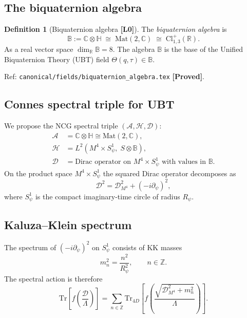 \documentclass[12pt,a4paper]{article}
\theoremstyle{definition}
\newtheorem{definition}[theorem]{Definition}
\theoremstyle{remark}
\newcommand{\PROVED}{\textbf{[Proved]}}
\newcommand{\Lzero}{\textbf{[L0]}}
\newcommand{\CC}{\mathbb{C}}
\newcommand{\Bq}{\mathbb{C}\otimes\mathbb{H}}
\begin{document}
\subsection{The biquaternion algebra}

\begin{definition}[Biquaternion algebra \Lzero]
The \emph{biquaternion algebra} is
\[
\mathbb{B} := \Bq \;\cong\; \mathrm{Mat}(2,\CC) \;\cong\; \mathrm{Cl}^{+}_{1,3}(\mathbb{R}).
\]
As a real vector space $\dim_\mathbb{R}\mathbb{B}=8$.
The algebra $\mathbb{B}$ is the base of the Unified Biquaternion Theory (UBT)
field $\Theta(q,\tau)\in\mathbb{B}$.

Ref: \texttt{canonical/fields/biquaternion\_algebra.tex} \PROVED.
\end{definition}

\subsection{Connes spectral triple for UBT}

We propose the NCG spectral triple $(\mathcal{A},\mathcal{H},\mathcal{D})$:
\begin{align}
\mathcal{A} &= \Bq \cong \mathrm{Mat}(2,\CC), \\
\mathcal{H} &= L^2(M^4\times S^1_\psi,\; S\otimes\mathbb{B}), \\
\mathcal{D} &= \text{Dirac operator on }M^4\times S^1_\psi\text{ with values in }\mathbb{B}.
\end{align}
On the product space $M^4\times S^1_\psi$ the squared Dirac operator decomposes as
\begin{equation}
\mathcal{D}^2 = \mathcal{D}_{M^4}^2 + (-i\partial_\psi)^2,
\label{eq:D2}
\end{equation}
where $S^1_\psi$ is the compact imaginary-time circle of radius $R_\psi$.

\subsection{Kaluza--Klein spectrum}

The spectrum of $(-i\partial_\psi)^2$ on $S^1_\psi$ consists of KK masses
\begin{equation}
m_n^2 = \frac{n^2}{R_\psi^2}, \qquad n\in\mathbb{Z}.
\label{eq:KKspectrum}
\end{equation}
The spectral action is therefore
\begin{equation}
\mathrm{Tr}\!\left[f\!\left(\frac{\mathcal{D}}{\Lambda}\right)\right]
= \sum_{n\in\mathbb{Z}}
  \mathrm{Tr}_{4D}\!\left[f\!\left(\frac{\sqrt{\mathcal{D}_{M^4}^2 + m_n^2}}{\Lambda}\right)\right].
\label{eq:spectral_KK}
\end{equation}
\end{document}
